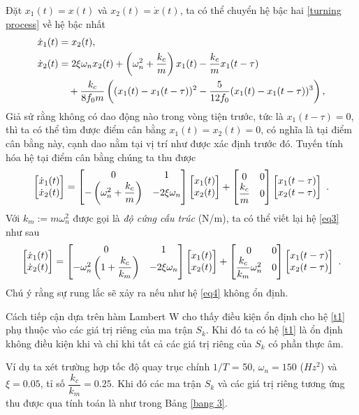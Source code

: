 \noindent Đặt $x_1(t) = x(t)$ và $x_2(t) = \dot{x}(t)$, ta có thể chuyển hệ bậc hai \eqref{turning process} về hệ bậc nhất 
%
\begin{align}\label{turning proceess 2}
\dot{x}_1(t) &= x_2(t), \notag \\
\dot{x}_2(t) &= 2 \xi \omega_n {x}_2(t) + \left( \omega_n^2 + \dfrac{k_c}{m}\right) x_1(t) - \dfrac{k_c}{m} x_1(t-\tau ) \notag \\
& \quad + \dfrac{k_c}{8 f_0 m} \left( (x_1(t) - x_1(t-\tau) )^2 - \dfrac{5}{12 f_0} (x_1(t) - x_1(t-\tau) )^3 \right),  
\end{align}
%
Giả sử rằng không có dao động nào trong vòng tiện trước, tức là $x_1(t-\tau) = 0$, thì ta có thể tìm được điểm cân bằng $x_1(t)=x_2(t) = 0$, 
có nghĩa là tại điểm cân bằng này, cạnh dao nằm tại vị trí như được xác định trước đó.
Tuyến tính hóa hệ tại điểm cân bằng chúng ta thu được
%
\begin{equation}\label{eq3}
\begin{bmatrix} \dot{x}_1(t) \\ \dot{x}_2(t) \end{bmatrix} = \begin{bmatrix} 0 & 1 \\ -\left( \omega_n^2 + \dfrac{k_c}{m}\right) & - 2 \xi \omega_n  \end{bmatrix} \begin{bmatrix} {x}_1(t) \\ {x}_2(t) \end{bmatrix} 
+ \begin{bmatrix} 0 & 0 \\ \dfrac{k_c}{m} & 0  \end{bmatrix} \begin{bmatrix} {x}_1(t-\tau) \\ {x}_2(t-\tau) \end{bmatrix} \ .
\end{equation}
%
Với $k_m := m \omega_n^2$ được gọi là \emph{độ cứng cấu trúc} (N/m), ta có thể viết lại hệ \eqref{eq3} như sau
%
\begin{equation}\label{eq4}
\begin{bmatrix} \dot{x}_1(t) \\ \dot{x}_2(t) \end{bmatrix} = \begin{bmatrix} 0 & 1 \\ - \omega_n^2 \left( 1 + \dfrac{k_c}{k_m}\right) & - 2 \xi \omega_n  \end{bmatrix} \begin{bmatrix} {x}_1(t) \\ {x}_2(t) \end{bmatrix} 
+ \begin{bmatrix} 0 & 0 \\ \dfrac{k_c}{k_m}\omega_n^2 & 0  \end{bmatrix} \begin{bmatrix} {x}_1(t-\tau) \\ {x}_2(t-\tau) \end{bmatrix} \ .
\end{equation}
%
Chú ý rằng sự rung lắc sẽ xảy ra nếu như hệ \eqref{eq4} không ổn định. 

Cách tiếp cận dựa trên hàm Lambert W cho thấy điều kiện ổn định cho hệ \eqref{t1} phụ thuộc vào các giá trị riêng của ma trận $S_k$. Khi đó ta có hệ \eqref{t1} là ổn định không điều kiện khi và chỉ khi tất cả các giá trị riêng của $S_k$ có phần thực âm. 

Ví dụ ta xét trường hợp tốc độ quay trục chính $1/T$ = 50, $\omega_n = 150$ ($Hz^2$) và $\xi = 0.05$, tỉ số $\dfrac{k_c}{k_m} = 0.25$.
Khi đó các ma trận $S_k$ và các giá trị riêng tương ứng thu được qua tính toán là như trong Bảng \ref{bang 3}.

